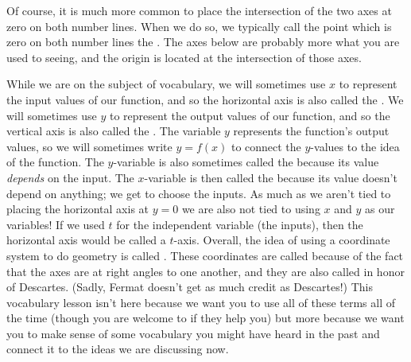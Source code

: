 \documentclass{ximera}
\begin{document}
Of course, it is much more common to place the intersection of the two axes at zero on both number lines. When we do so, we typically call the point which is zero on both number lines the . The axes below are probably more what you are used to seeing, and the origin is located at the intersection of those axes.
\begin{image}
\end{image}
While we are on the subject of vocabulary, we will sometimes use $x$ to represent the input values of our function, and so the horizontal axis is also called the . We will sometimes use $y$ to represent the output values of our function, and so the vertical axis is also called the . The variable $y$ represents the function's output values, so we will sometimes write $y=f(x)$ to connect the $y$-values to the idea of the function. The $y$-variable is also sometimes called the  because its value \emph{depends} on the input. The $x$-variable is then called the  because its value doesn't depend on anything; we get to choose the inputs. As much as we aren't tied to placing the horizontal axis at $y=0$ we are also not tied to using $x$ and $y$ as our variables! If we used $t$ for the independent variable (the inputs), then the horizontal axis would be called a $t$-axis. Overall, the idea of using a coordinate system to do geometry is called . These coordinates are called  because of the fact that the axes are at right angles to one another, and they are also called  in honor of Descartes. (Sadly, Fermat doesn't get as much credit as Descartes!) This vocabulary lesson isn't here because we want you to use all of these terms all of the time (though you are welcome to if they help you) but more because we want you to make sense of some vocabulary you might have heard in the past and connect it to the ideas we are discussing now.
\end{document}

